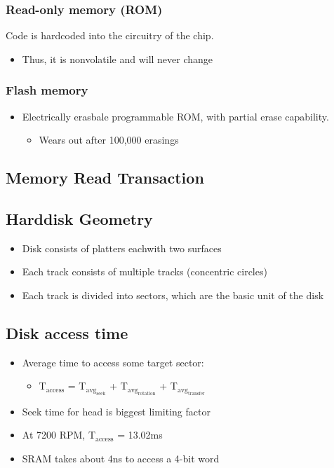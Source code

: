 \documentclass[11pt]{article}
\begin{document}
\subsubsection{Read-only memory (ROM)}
\label{sec:orgheadline4}
Code is hardcoded into the circuitry of the chip.
\begin{itemize}
\item Thus, it is nonvolatile and will never change
\end{itemize}
\subsubsection{Flash memory}
\label{sec:orgheadline5}
\begin{itemize}
\item Electrically erasbale programmable ROM, with partial erase capability.
\begin{itemize}
\item Wears out after 100,000 erasings
\end{itemize}
\end{itemize}
\subsection{Memory Read Transaction}
\label{sec:orgheadline7}
\subsection{Harddisk Geometry}
\label{sec:orgheadline8}
\begin{itemize}
\item Disk consists of platters eachwith two surfaces
\item Each track consists of multiple tracks (concentric circles)
\item Each track is divided into sectors, which are the basic unit of the disk
\end{itemize}
\subsection{Disk access time}
\label{sec:orgheadline9}
\begin{itemize}
\item Average time to access some target sector:
\begin{itemize}
\item T\(_{\text{access}}\) = T\(_{\text{avg}}_{\text{seek}}\) + T\(_{\text{avg}}_{\text{rotation}}\) + T\(_{\text{avg}}_{\text{transfer}}\)
\end{itemize}
\item Seek time for head is biggest limiting factor
\item At 7200 RPM, T\(_{\text{access}}\) = 13.02ms
\item SRAM takes about 4ns to access a 4-bit word
\end{itemize}
\end{document}
